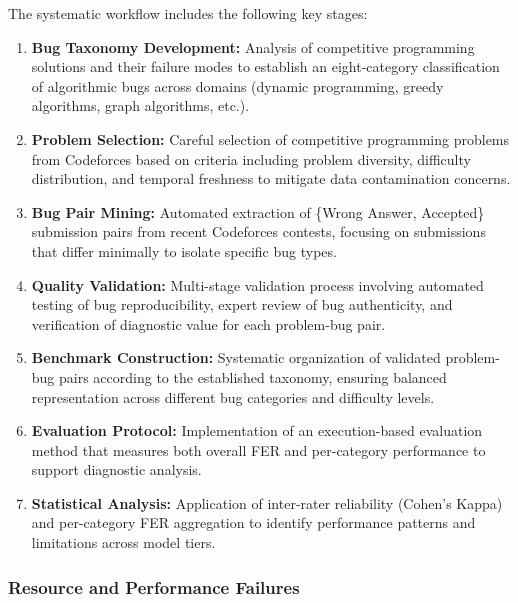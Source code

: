 The systematic workflow includes the following key stages:

\begin{enumerate}
    \item \textbf{Bug Taxonomy Development:} Analysis of competitive programming solutions and their failure modes to establish an eight-category classification of algorithmic bugs across domains (dynamic programming, greedy algorithms, graph algorithms, etc.).
    
    \item \textbf{Problem Selection:} Careful selection of competitive programming problems from Codeforces based on criteria including problem diversity, difficulty distribution, and temporal freshness to mitigate data contamination concerns.
    
    \item \textbf{Bug Pair Mining:} Automated extraction of \{Wrong Answer, Accepted\} submission pairs from recent Codeforces contests, focusing on submissions that differ minimally to isolate specific bug types.
    
    \item \textbf{Quality Validation:} Multi-stage validation process involving automated testing of bug reproducibility, expert review of bug authenticity, and verification of diagnostic value for each problem-bug pair.
    
    \item \textbf{Benchmark Construction:} Systematic organization of validated problem-bug pairs according to the established taxonomy, ensuring balanced representation across different bug categories and difficulty levels.
    
    \item \textbf{Evaluation Protocol:} Implementation of an execution-based evaluation method that measures both overall FER and per-category performance to support diagnostic analysis.

    \item \textbf{Statistical Analysis:} Application of inter-rater reliability (Cohen's Kappa) and per-category FER aggregation to identify performance patterns and limitations across model tiers.
\end{enumerate}

\subsubsection{Resource and Performance Failures}

